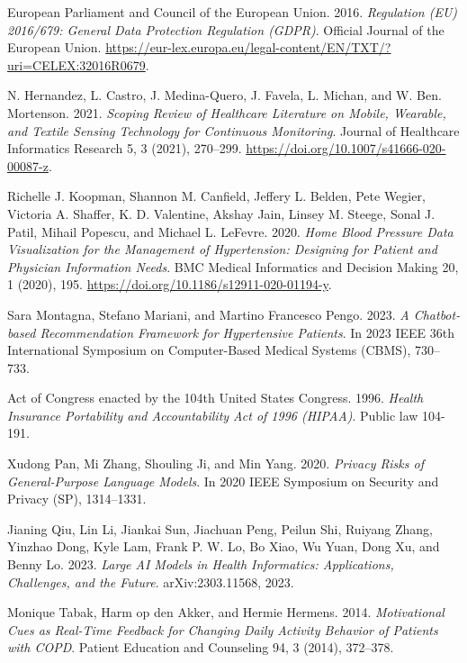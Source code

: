 \begin{thebibliography}{55}
European Parliament and Council of the European Union. 2016. \emph{Regulation (EU) 2016/679: General Data Protection Regulation (GDPR)}. Official Journal of the European Union. \url{https://eur-lex.europa.eu/legal-content/EN/TXT/?uri=CELEX:32016R0679}.

N. Hernandez, L. Castro, J. Medina-Quero, J. Favela, L. Michan, and W. Ben. Mortenson. 2021. \emph{Scoping Review of Healthcare Literature on Mobile, Wearable, and Textile Sensing Technology for Continuous Monitoring}. Journal of Healthcare Informatics Research 5, 3 (2021), 270--299. \url{https://doi.org/10.1007/s41666-020-00087-z}.

Richelle J. Koopman, Shannon M. Canfield, Jeffery L. Belden, Pete Wegier, Victoria A. Shaffer, K. D. Valentine, Akshay Jain, Linsey M. Steege, Sonal J. Patil, Mihail Popescu, and Michael L. LeFevre. 2020. \emph{Home Blood Pressure Data Visualization for the Management of Hypertension: Designing for Patient and Physician Information Needs}. BMC Medical Informatics and Decision Making 20, 1 (2020), 195. \url{https://doi.org/10.1186/s12911-020-01194-y}.

Sara Montagna, Stefano Mariani, and Martino Francesco Pengo. 2023. \emph{A Chatbot-based Recommendation Framework for Hypertensive Patients}. In 2023 IEEE 36th International Symposium on Computer-Based Medical Systems (CBMS), 730--733.

Act of Congress enacted by the 104th United States Congress. 1996. \emph{Health Insurance Portability and Accountability Act of 1996 (HIPAA)}. Public law 104-191.

Xudong Pan, Mi Zhang, Shouling Ji, and Min Yang. 2020. \emph{Privacy Risks of General-Purpose Language Models}. In 2020 IEEE Symposium on Security and Privacy (SP), 1314--1331.

Jianing Qiu, Lin Li, Jiankai Sun, Jiachuan Peng, Peilun Shi, Ruiyang Zhang, Yinzhao Dong, Kyle Lam, Frank P. W. Lo, Bo Xiao, Wu Yuan, Dong Xu, and Benny Lo. 2023. \emph{Large AI Models in Health Informatics: Applications, Challenges, and the Future}. arXiv:2303.11568, 2023.

Monique Tabak, Harm op den Akker, and Hermie Hermens. 2014. \emph{Motivational Cues as Real-Time Feedback for Changing Daily Activity Behavior of Patients with COPD}. Patient Education and Counseling 94, 3 (2014), 372--378.


\end{thebibliography}
